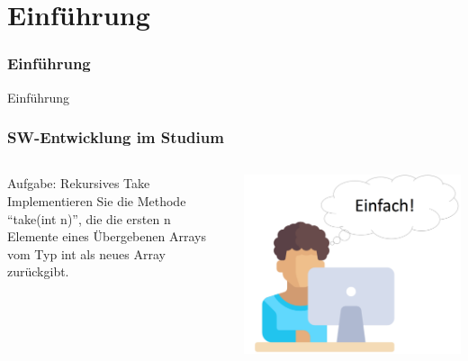 \section{Einführung}
\begin{frame}[fragile]
	\frametitle{Einführung}
\huge Einführung
\end{frame}

\begin{frame}[fragile]
	\frametitle{SW-Entwicklung im Studium}
	\begin{columns}
		\begin{column}{.5\textwidth}
			Aufgabe: Rekursives Take
			\newline\newline
			Implementieren Sie die Methode ``take(int n)'', die
			die ersten n Elemente eines Übergebenen Arrays
			vom Typ int als neues Array zurückgibt.
		\end{column}
		\begin{column}{.5\textwidth}
			\center\includegraphics[width=1\textwidth,
			keepaspectratio=true]{bilder/student.png}
		\end{column}
	\end{columns}
\end{frame}

